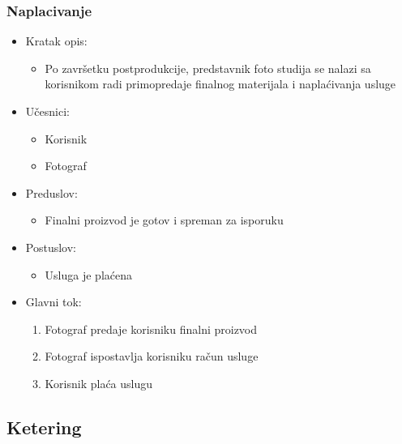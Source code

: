 \documentclass[a4paper]{article}
\begin{document}
\subsubsection{Naplacivanje}
\begin{itemize}
    \item Kratak opis: 
    \begin{itemize}
        \item Po završetku postprodukcije, predstavnik foto studija se nalazi sa korisnikom radi primopredaje finalnog materijala i naplaćivanja usluge
    \end{itemize}
    \item Učesnici:
        \begin{itemize}
        \item Korisnik
        \item Fotograf
    \end{itemize}
    \item Preduslov:
        \begin{itemize}
            \item Finalni proizvod je gotov i spreman za isporuku
        \end{itemize}
    \item Postuslov:
        \begin{itemize}
            \item Usluga je plaćena
            \end{itemize}
    \item Glavni tok:
        \begin{enumerate}
            \item Fotograf predaje korisniku finalni proizvod
            \item Fotograf ispostavlja korisniku račun usluge
            \item Korisnik plaća uslugu
        \end{enumerate}
\end{itemize}



\subsection{Ketering}
\end{document}
